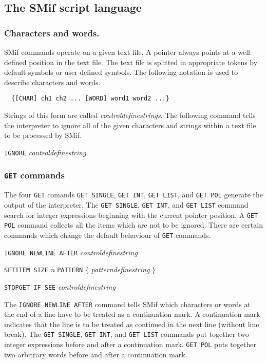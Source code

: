 \documentclass{article}
\begin{document}
\subsection{The SMif script language}

\subsubsection{Characters and words.}

SMif commands operate on a given text file. A pointer always points at
a well defined position in the text file. The text file is splitted in
appropriate tokens by default symbols or user defined symbols. The
following notation is used to describe characters and words.

\begin{verbatim}
  {[CHAR] ch1 ch2 ... [WORD] word1 word2 ...}
\end{verbatim}

Strings of this form are called \emph{controldefinestrings}. The
following command tells the interpreter to ignore all of the given
characters and strings within a text file to be processed by SMif.

\texttt{IGNORE} \emph{controldefinestring}

\subsubsection{\texttt{GET} commands}

The four \texttt{GET} comands \texttt{GET SINGLE}, \texttt{GET INT},
\texttt{GET LIST}, and \texttt{GET POL} generate the output of the
interpreter.  The \texttt{GET SINGLE}, \texttt{GET INT}, and
\texttt{GET LIST} command search for integer expressions beginning
with the current pointer position. A \texttt{GET POL} command collects
all the items which are not to be ignored. There are certain commands
which change the default behaviour of \texttt{GET} commands.

\texttt{IGNORE NEWLINE AFTER} \emph{controldefinestring}

\texttt{SETITEM SIZE} \emph{n} \texttt{PATTERN} $\{$
\emph{patterndefinestring }$\}$

\texttt{STOPGET IF SEE} \emph{controldefinestring}

The \texttt{IGNORE NEWLINE AFTER} command tells SMif which characters
or words at the end of a line have to be treated as a continuation
mark.  A continuation mark indicates that the line is to be treated as
continued in the next line (without line break). The \texttt{GET
  SINGLE}, \texttt{GET INT}, and \texttt{GET LIST} commands put
together two integer expressions before and after a continuation mark.
\texttt{GET POL} puts together two arbitrary words before and after a
continuation mark.
\end{document}
